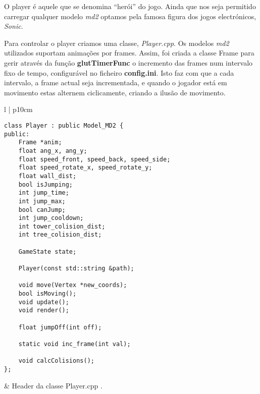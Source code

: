 
O player é aquele que se denomina ``herói'' do jogo. Ainda que nos seja permitido carregar qualquer modelo \textit{md2} optamos pela famosa figura dos jogos electrónicos, \textit{Sonic}.

Para controlar o player criamos uma classe, \textit{Player.cpp}.
Os modelos \textit{md2} utilizados suportam animações por frames. Assim, foi criada a classe Frame para gerir através da função \textbf{glutTimerFunc} o incremento das frames num intervalo fixo de tempo, configurável no ficheiro \textbf{config.ini}. Isto faz com que a cada intervalo, a frame actual seja incrementada, e quando o jogador está em movimento estas alternem ciclicamente, criando a ilusão de movimento.

\-
\begin{tabular} {l | p{10cm}}
\begin{lstlisting}
class Player : public Model_MD2 {
public:
	Frame *anim;
	float ang_x, ang_y;
	float speed_front, speed_back, speed_side;
	float speed_rotate_x, speed_rotate_y;
	float wall_dist;
	bool isJumping;
	int jump_time;
	int jump_max;
	bool canJump;
	int jump_cooldown;
	int tower_colision_dist;
	int tree_colision_dist;

	GameState state;

	Player(const std::string &path);

	void move(Vertex *new_coords);
	bool isMoving();
	void update();
	void render();

	float jumpOff(int off);

	static void inc_frame(int val);

	void calcColisions();
};
\end{lstlisting} 
&
Header da classe Player.cpp .\\
\end{tabular}

